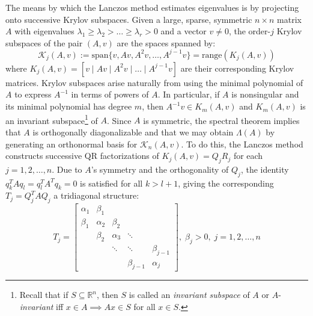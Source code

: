 \documentclass[10pt]{article}
\numberwithin{equation}{section}
\newcommand{\+}{%
	\raisebox{0.18ex}{\scaleobj{0.55}{+}}
}
\theoremstyle{definition}
\theoremstyle{definition}
\begin{document}
The means by which the Lanczos method estimates eigenvalues is by projecting onto successive Krylov subspaces. Given a large, sparse, symmetric $n \times n$ matrix $A$ with eigenvalues $\lambda_1 \geq \lambda_2 > \dots \geq \lambda_r > 0$ and a vector $v \neq 0$, the order-$j$ Krylov subspaces of the pair $(A, v)$ are the spaces spanned by: 
\begin{equation}
	\mathcal{K}_j(A, v) := \mathrm{span}\{ v, Av, A^2 v, \dots, A^{j-1}v \} = \mathrm{range}(K_j(A, v))
\end{equation}
where $K_j(A, v) = [ v \mid Av \mid A^2 v \mid \dots \mid A^{j-1}v]$ are their corresponding Krylov matrices. 
Krylov subspaces arise naturally from using the minimal polynomial of $A$ to express $A^{-1}$ in terms of powers of $A$. In particular, if $A$ is nonsingular and its minimal polynomial has degree $m$, then $A^{-1}v \in K_m(A, v)$ and $K_m(A, v)$ is an invariant subspace\footnote{Recall that if $S \subseteq \mathbb{R}^n$, then $S$ is called an \emph{invariant subspace} of $A$ or $A$-\emph{invariant} iff $x \in A \implies Ax \in S$ for all $x \in S$.} of $A$.
Since $A$ is symmetric, the spectral theorem implies that $A$ is orthogonally diagonalizable and that we may obtain $\Lambda(A)$ by generating an orthonormal basis for $\mathcal{K}_n(A, v)$. 
To do this, the Lanczos method constructs successive QR factorizations of $K_j(A,v) = Q_j R_j$ for each $j = 1, 2, \dots, n$.
Due to $A$'s symmetry and the orthogonality of $Q_j$, the identity $q_k^T A q_l = q_l^T A^T q_k = 0$ is satisfied for all $k > l + 1$, giving the corresponding $T_j = Q_j^T A Q_j$ a tridiagonal structure:
\begin{equation}
	T_j = \begin{bmatrix} 
	\alpha_1 & \beta_1 & & & \\
	\beta_1 & \alpha_2 & \beta_2 & & \\
	 & \beta_2 & \alpha_3 & \ddots & \\
	& & \ddots & \ddots & \beta_{j-1} \\
	& & & \beta_{j-1} & \alpha_{j} 
	\end{bmatrix}, \; \beta_j > 0, \; j = 1, 2, \dots, n
\end{equation}
\end{document}
